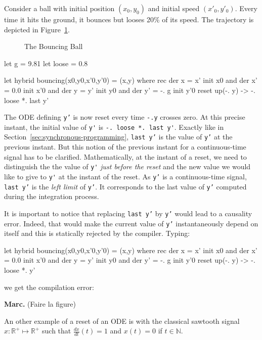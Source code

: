 \documentclass[11pt,titlepage,twoside]{report}
\newcommand{\DotNotation}[1]{\frac{\mathit{d}{#1}}{\mathit{dt}}}
\newcommand{\bR}{\mathbb{R}}
\newcommand{\bN}{\mathbb{N}}
\newcommand{\Marc}[1]{{\bf Marc.} ({#1})}
\begin{document}
Consider a ball with initial position $(x_0, y_0)$ and initial speed
$(x'_0, y'_0)$. Every time it hits the ground, it bounces but looses
20\% of its speed. The trajectory is depicted in Figure~\ref{fig:bouncing-ball}.

\begin{figure}
\caption{The Bouncing Ball~\label{fig:bouncing-ball}}
\end{figure}

\begin{runverbatim}[label=gravity]
let g = 9.81
let loose = 0.8
\end{runverbatim}
\begin{runverbatim}
let hybrid bouncing(x0,y0,x'0,y'0) = (x,y) where
 rec der x = x' init x0
 and der x' = 0.0 init x'0
 and der y = y' init y0
 and der y' = -. g init y'0 reset up(-. y) -> -. loose *. last y'
\end{runverbatim}

The \ac{ODE} defining \texttt{y'} is now reset every time \texttt{-.y}
crosses zero.  At this precise instant, the initial value of \verb-y'-
is \verb+-. loose *. last y'+. Exactly like in
Section~\ref{sec:synchronous-programming}, \texttt{last y'} is the
value of \texttt{y'} at the previous instant. But this notion of the
previous instant for a continuous-time signal has to be
clarified. Mathematically, at the instant of a reset, we need to
distinguish the the value of \verb-y'- \emph{just before the reset}
and the new value we would like to give to \verb-y'- at the instant of
the reset. As \texttt{y'} is a continuous-time signal, \texttt{last
  y'} is the \emph{left limit} of \texttt{y'}. It corresponds to the
last value of \texttt{y'} computed during the integration process.

It is important to notice that replacing \texttt{last y'} by
\texttt{y'} would lead to a causality error. Indeed, that would make
the current value of \texttt{y'} instantaneously depend on itself and
this is statically rejected by the compiler. Typing:

\begin{runverbatim}[include=gravity,fail]
let hybrid bouncing(x0,y0,x'0,y'0) = (x,y) where
 rec der x = x' init x0
 and der x' = 0.0 init x'0
 and der y = y' init y0
 and der y' = -. g init y'0 reset up(-. y) -> -. loose *. y'
\end{runverbatim}
we get the compilation error:
\runverbatimerr

\Marc{Faire la figure}

An other example of a reset of an \ac{ODE} is with the classical sawtooth
signal $x: \bR^+ \mapsto \bR^+$ such that $\DotNotation{x}(t) = 1$ and
$x(t) = 0$ if $t\in\bN$.
\end{document}
